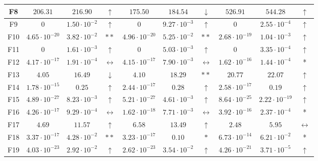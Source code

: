 \begin{table}[!t]
\begin{scriptsize}
\begin{tabular}{c || c c c | c c c | c c c }
F8  & $206.31$              & $216.90$              & $\uparrow$        & $175.50$              & $184.54$             & $\downarrow$      & $526.91$              & $544.28$              & $\uparrow$        \\ \hline
F9  & $0$                   & $1.50 \cdot 10^{-2}$  & $\uparrow$        & $0$                   & $9.27 \cdot 10^{-3}$ & $\uparrow$        & $0$                   & $2.55 \cdot 10^{-4}$  & $\uparrow$        \\ \hline
F10 & $4.65 \cdot 10^{-20}$ & $3.82 \cdot 10^{-2}$  & $**$               & $4.96 \cdot 10^{-20}$ & $5.25 \cdot 10^{-2}$ & $**$               & $2.68 \cdot 10^{-19}$ & $1.04 \cdot 10^{-3}$  & $\uparrow$        \\ \hline
F11 & $0$                   & $1.61 \cdot 10^{-3}$  & $\uparrow$        & $0$                   & $5.03 \cdot 10^{-3}$ & $\uparrow$        & $0$                   & $3.35 \cdot 10^{-4}$  & $\uparrow$        \\ \hline
F12 & $4.17 \cdot 10^{-17}$ & $1.91 \cdot 10^{-4}$  & $\leftrightarrow$ & $4.15 \cdot 10^{-17}$ & $7.90 \cdot 10^{-3}$ & $\leftrightarrow$ & $1.62 \cdot 10^{-16}$ & $1.44 \cdot 10^{-4}$  & *                 \\ \hline
F13 & $4.05$                & $16.49$               & $\downarrow$      & $4.10$                & $18.29$              & $**$               & $20.77$               & $22.07$               & $\uparrow$        \\ \hline
F14 & $1.78 \cdot 10^{-15}$ & $0.25$                & $\uparrow$        & $2.44 \cdot 10^{-17}$ & $0.28$               & $\uparrow$        & $2.58 \cdot 10^{-17}$ & $0.19$                & $\uparrow$        \\ \hline
F15 & $4.89 \cdot 10^{-27}$ & $8.23 \cdot 10^{-3}$  & $\uparrow$        & $5.21 \cdot 10^{-27}$ & $4.61 \cdot 10^{-3}$ & $\uparrow$        & $8.64 \cdot 10^{-25}$ & $2.22 \cdot 10^{-19}$ & $\uparrow$        \\ \hline
F16 & $4.26 \cdot 10^{-17}$ & $9.29 \cdot 10^{-4}$  & $\leftrightarrow$ & $1.62 \cdot 10^{-18}$ & $7.71 \cdot 10^{-3}$ & $\leftrightarrow$ & $3.92 \cdot 10^{-16}$ & $2.37 \cdot 10^{-4}$  & *                 \\ \hline
F17 & $4.69$                & $11.57$               & $\uparrow$        & $6.58$                & $13.49$              & $\uparrow$        & $2.48$                & $5.95$                & $\leftrightarrow$ \\ \hline
F18 & $3.37 \cdot 10^{-17}$ & $4.28 \cdot 10^{-2}$  & $**$               & $3.23 \cdot 10^{-17}$ & $0.10$               & $*$               & $6.73 \cdot 10^{-14}$ & $6.21 \cdot 10^{-2}$  & *                 \\ \hline
F19 & $4.03 \cdot 10^{-23}$ & $2.92 \cdot 10^{-2}$  & $\uparrow$        & $2.62 \cdot 10^{-23}$ & $3.54 \cdot 10^{-2}$ & $\uparrow$        & $4.26 \cdot 10^{-21}$ & $3.71 \cdot 10^{-5}$  & $\uparrow$        \\ \hline
\end{tabular}
\end{scriptsize}
\end{table}
